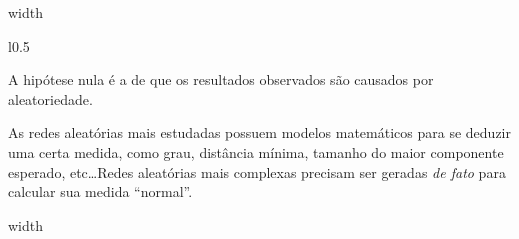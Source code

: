 \documentclass[10pt,a4paper,final]{article}
\newcommand\disappearingrule{%
  \par %
  \vskip10pt %
  \leaders\vrule width \textwidth\vskip0.4pt %
  \nointerlineskip %
  \vskip10pt %
}
\begin{document}
\disappearingrule

\begin{minipage}[t][18\baselineskip]{\linewidth}
  \begin{wrapfigure}{l}{0.5\textwidth}
  \end{wrapfigure}
  
  A hipótese nula é a de que os resultados observados são causados por aleatoriedade.
  
  As redes aleatórias mais estudadas possuem modelos matemáticos para se deduzir uma certa medida, como grau, distância mínima, tamanho do maior componente esperado, etc\ldots Redes aleatórias mais complexas precisam ser geradas \textit{de fato} para calcular sua medida \enquote{normal}.
\end{minipage}

\disappearingrule
\end{document}
